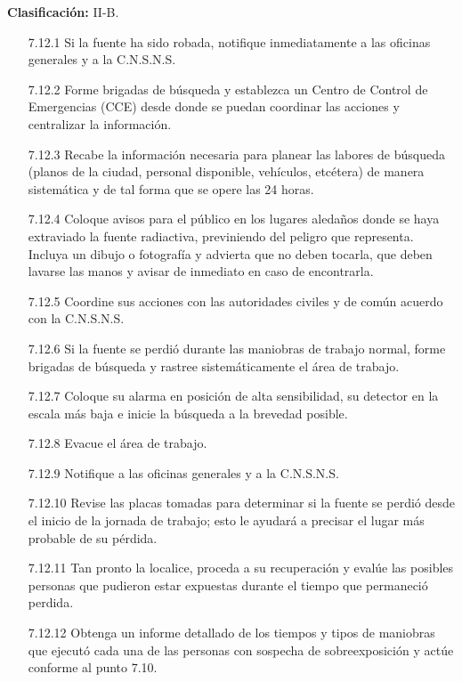 \textbf{Clasificación:} II-B.
\begin{enumerate}
  \item[7.12.1] Si la fuente ha sido robada, notifique inmediatamente a las oficinas generales y a la C.N.S.N.S.
  \item[7.12.2] Forme brigadas de búsqueda y establezca un Centro de Control de Emergencias (CCE) desde donde se puedan coordinar las acciones y centralizar la información.
  \item[7.12.3] Recabe la información necesaria para planear las labores de búsqueda (planos de la ciudad, personal disponible, vehículos, etcétera) de manera sistemática y de tal forma que se opere las 24 horas.
  \item[7.12.4] Coloque avisos para el público en los lugares aledaños donde se haya extraviado la fuente radiactiva, previniendo del peligro que representa. Incluya un dibujo o fotografía y advierta que no deben tocarla, que deben lavarse las manos y avisar de inmediato en caso de encontrarla.
  \item[7.12.5] Coordine sus acciones con las autoridades civiles y de común acuerdo con la C.N.S.N.S.
  \item[7.12.6] Si la fuente se perdió durante las maniobras de trabajo normal, forme brigadas de búsqueda y rastree sistemáticamente el área de trabajo.
  \item[7.12.7] Coloque su alarma en posición de alta sensibilidad, su detector en la escala más baja e inicie la búsqueda a la brevedad posible.
  \item[7.12.8] Evacue el área de trabajo.
  \item[7.12.9] Notifique a las oficinas generales y a la C.N.S.N.S.
  \item[7.12.10] Revise las placas tomadas para determinar si la fuente se perdió desde el inicio de la jornada de trabajo; esto le ayudará a precisar el lugar más probable de su pérdida.
  \item[7.12.11] Tan pronto la localice, proceda a su recuperación y evalúe las posibles personas que pudieron estar expuestas durante el tiempo que permaneció perdida.
  \item[7.12.12] Obtenga un informe detallado de los tiempos y tipos de maniobras que ejecutó cada una de las personas con sospecha de sobreexposición y actúe conforme al punto 7.10.
\end{enumerate}
